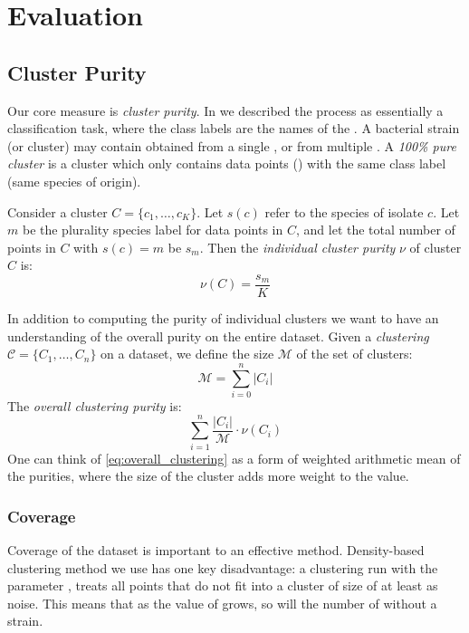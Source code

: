 \chapter{Evaluation}\label{chap:evaluation}

\section{Cluster Purity}

Our core measure is \textit{cluster purity}. In \cite{DBLP:conf/bibm/McGovernDKBVG15} we
described the \mst{} process as essentially a classification task, where the class
labels are the names of the \spec{}. A \cplop{} bacterial strain (or cluster) may
contain \isols{} obtained from a single \spec{}, or from multiple \spec{}. 
A \textit{100\% pure cluster} is a cluster which only contains data points (\isols{}) with the same
class label (same species of origin). 

Consider a cluster $C=\{c_1,\ldots, c_K\}$. Let $s(c)$ refer to the species of isolate $c$.
Let $m$ be the plurality species label for data points in $C$, and let the total number of points in
$C$ with $s(c) = m$ be $s_m$. Then the \textit{individual cluster purity} $\nu$ of cluster $C$ is:
\[
    \nu(C) = \frac{s_m}{K}
\]

In addition to computing the purity of individual clusters
we want to have an understanding of the overall purity on the entire dataset.
Given a \textit{clustering} $\mathcal{C} = \{C_1,\dots,C_n\}$ on a dataset, we define the size $\mathcal{M}$ of the set of clusters: 
\begin{equation}\label{eq:num_isols}
\mathcal{M} = \sum_{i = 0}^{n} |C_i|
\end{equation}
The \textit{overall clustering purity} is:
\begin{equation}\label{eq:overall_clustering}
\sum_{i=1}^{n} \frac{|C_i|}{\mathcal{M}}\cdot\nu(C_i)
\end{equation}
One can think of \eqref{eq:overall_clustering} as a form of weighted arithmetic mean of the purities, where the size of the cluster adds more weight to the value.

\subsection{Coverage} \label{sec:validation:coverage}
Coverage of the dataset is important to an effective \mst{} method.
Density-based clustering method we use has one key disadvantage: a clustering run 
with the parameter \minneigh{}, treats all points that do not fit into a cluster of size 
of at least \minneigh{} as noise. This means that as the value of \minneigh{} grows,
so will the number of \isols{} without a strain. 


